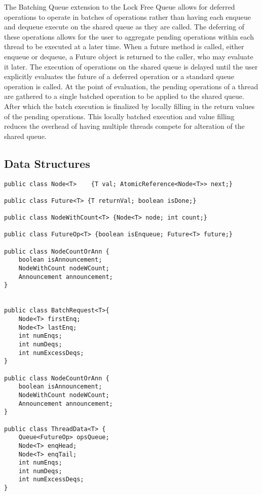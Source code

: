 
\setcounter{subsection}{0}
The Batching Queue extension to the Lock Free Queue allows for deferred operations to operate in batches of operations rather than having each enqueue and dequeue execute on the shared queue as they are called. The deferring of these operations allows for the user to aggregate pending operations within each thread to be executed at a later time. When a future method is called, either enqueue or dequeue, a Future object is returned to the caller, who may evaluate it later. The execution of operations on the shared queue is delayed until the user explicitly evaluates the future of a deferred operation or a standard queue operation is called. At the point of evaluation, the pending operations of a thread are gathered to a single batched operation to be applied to the shared queue. After which the batch execution is finalized by locally filling in the return values of the pending operations. This locally batched execution and value filling reduces the overhead of having multiple threads compete for alteration of the shared queue.\newline





\subsection{Data Structures}
\begin{lstlisting} 
public class Node<T>    {T val; AtomicReference<Node<T>> next;}

public class Future<T> {T returnVal; boolean isDone;}

public class NodeWithCount<T> {Node<T> node; int count;}

public class FutureOp<T> {boolean isEnqueue; Future<T> future;}

public class NodeCountOrAnn {
    boolean isAnnouncement;
    NodeWithCount nodeWCount;
    Announcement announcement;
}


public class BatchRequest<T>{
    Node<T> firstEnq;
    Node<T> lastEnq;
    int numEnqs;
    int numDeqs;
    int numExcessDeqs;
}

public class NodeCountOrAnn {
    boolean isAnnouncement;
    NodeWithCount nodeWCount;
    Announcement announcement;
}

public class ThreadData<T> {
    Queue<FutureOp> opsQueue;
    Node<T> enqHead;
    Node<T> enqTail;
    int numEnqs;
    int numDeqs;
    int numExcessDeqs;
}\end{lstlisting}


